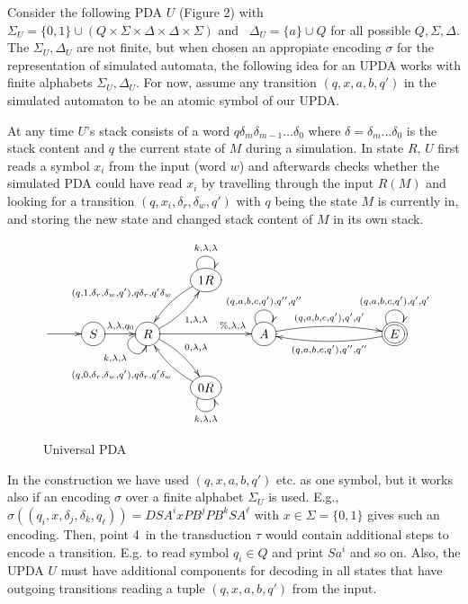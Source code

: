 \documentclass{eptcs}
\begin{document}
Consider the following PDA $U$ (Figure 2) with 
		  $\Sigma_U=\{0,1\}\cup (Q\times\Sigma\times\Delta\times\Delta\times\Sigma)$ and
		 \mbox{ $\Delta_U=\{a\}\cup Q$} for all possible $Q,\Sigma,\Delta$.
		  The $\Sigma_U,\Delta_U$ are not finite, but when chosen an appropiate
		  encoding $\sigma$ for the representation of simulated automata,
		  the following idea for an UPDA works with finite alphabets 
		  $\Sigma_U,\Delta_{U}$. For now, assume any transition $(q,x,a,b,q')$
		  in the simulated automaton to be an atomic symbol of our UPDA.
		  
		  At any time $U$'s stack consists of
		  a word $q\delta_m\delta_{m-1}\dots\delta_0$ where
$\delta=\delta_m\dots\delta_0$ is the stack content
                  and $q$ the current state
		  of $M$ during a simulation. In state $R$, $U$ first reads a symbol
		  $x_i$ from the input (word $w$) and afterwards checks whether the 
		  simulated PDA could have read $x_i$ by travelling through the input
		  $R(M)$ and looking for a transition $(q,x_i,\delta_r,\delta_w,q')$ with
		  $q$ being the state $M$ is currently in, and storing the new state
		  and changed stack content of $M$ in its own stack.


	\begin{figure}[htbp]
		\centerline{
		$\xymatrix{&&& *++[o][F]{1R} 
				\ar@(ul,ur)[]^{k,\lambda,\lambda}
				\ar@/_/[dl]_{(q,1,\delta_r,\delta_w,q'),q\delta_r,q'\delta_w} \\
				*{} \ar[r]
			& *++[o][F]{S} \ar[r]^{\lambda,\lambda,q_0} 
				& *++[o][F]{R} 
					\ar@(l,d)[]_{k,\lambda,\lambda}
					\ar@/_/[ur]_{1,\lambda,\lambda} 
					\ar@/^/[dr]^{0,\lambda,\lambda}
					\ar[rr]^>>>>>>{\%,\lambda,\lambda}
				&& *++[o][F]{A} 
					\ar@(ul,ur)[]^{(q,a,b,c,q'),q'',q''}
					\ar@/^/[rrr]^{(q,a,b,c,q'),q',q'}
				&&& *++[o][F=]{E} 
					\ar@(ul,ur)[]^{(q,a,b,c,q'),q',q'}
					\ar@/^/[lll]^{(q,a,b,c,q'),q'',q''}\\
			&&& *++[o][F]{0R}
				\ar@(dl,dr)[]_{k,\lambda,\lambda}
				\ar@/^/[ul]^{(q,0,\delta_r,\delta_w,q'),q\delta_r,q'\delta_w} \\
		}$
		}
		\caption{Universal PDA}
		\label{fig:upda}
	\end{figure}

In the construction we have used $(q,x,a,b,q')$ etc. as one symbol,
but it works also if an encoding $\sigma$ over a finite alphabet $\Sigma_U$ is used.
E.g., $\sigma((q_i,x,\delta_j,\delta_k,q_{\ell}))=DSA^ixPB^jPB^kSA^{\ell}$
with $x\in\Sigma=\{0,1\}$ gives such an encoding.
 Then, point 4\ in the transduction $\tau$ would contain 
additional steps to encode a transition. E.g. to read symbol $q_i\in Q$
and print $Sa^i$ and so on.
Also, the UPDA $U$ must have additional components for decoding
in all states that have outgoing transitions reading a tuple $(q,x,a,b,q')$
from the input.
\end{document}
